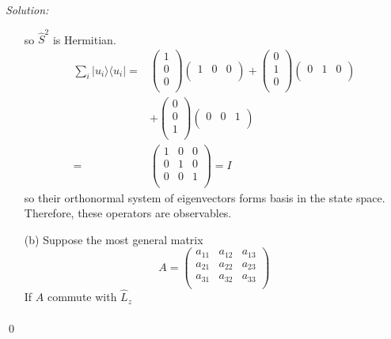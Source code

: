 \documentclass[12pt,a4paper]{article}
\newenvironment{sol}
    {\emph{Solution:}
    }
    {
    \qed
    }
\begin{document}
\begin{sol}
\begin{itemize}
\begin{equation}
\end{equation}
so $\hat{S}^2$ is Hermitian.
\begin{align}
\nonumber\sum_i|u_i\rangle\langle u_i|=&\left(\begin{array}{c}
1\\
0\\
0\\
\end{array}\right)\left(\begin{array}{ccc}
1&0&0\\
\end{array}\right)+\left(\begin{array}{c}
0\\
1\\
0\\
\end{array}\right)\left(\begin{array}{ccc}
0&1&0\\
\end{array}\right)\\
\nonumber&+\left(\begin{array}{c}
0\\
0\\
1\\
\end{array}\right)\left(\begin{array}{ccc}
0&0&1\\
\end{array}\right)\\
=&\left(\begin{array}{ccc}
1&0&0\\
0&1&0\\
0&0&1\\
\end{array}\right)=I
\end{align}
so their orthonormal system of eigenvectors forms basis in the state space.\\
Therefore, these operators are observables.
\item[(b)] Suppose the most general matrix
\begin{equation}
A=\left(\begin{array}{ccc}
a_{11}&a_{12}&a_{13}\\
a_{21}&a_{22}&a_{23}\\
a_{31}&a_{32}&a_{33}\\
\end{array}\right)
\end{equation}
If $A$ commute with $\hat{L}_z$
\begin{gather}

\end{gather}
\end{itemize}
\end{sol}
\end{document}
